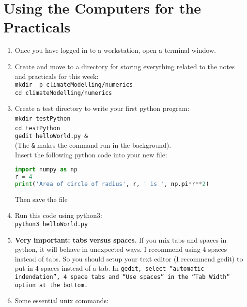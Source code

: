 \clearpage{}

\section{Using the Computers for the Practicals}
\begin{enumerate}
\item Once you have logged in to a workstation, open a terminal window.
\item Create and move to a directory for storing everything related to the
notes and practicals for this week:\\
\texttt{mkdir -p climateModelling/numerics}\\
\texttt{cd climateModelling/numerics}
\item Create a test directory to write your first python program:\\
\texttt{mkdir testPython}~\\
\texttt{cd testPython}~\\
\texttt{gedit helloWorld.py \&}\\
(The \texttt{\&} makes the command run in the background). \\
Insert the following python code into your new file:\\
\begin{lstlisting}[language=Python]
import numpy as np
r = 4
print('Area of circle of radius', r, ' is ', np.pi*r**2)
\end{lstlisting}
Then save the file
\item Run this code using python3:\\
\texttt{python3 helloWorld.py}
\item \textbf{Very important: tabs versus spaces.} If you mix tabs and spaces
in python, it will behave in unexpected ways. I recommend using 4
spaces instead of tabs. So you should setup your text editor (I recommend
gedit) to put in 4 spaces instead of a tab. In \texttt{gedit, select
``automatic indendation'', 4 space tabs and ``Use spaces'' in
the ``Tab Width'' option at the bottom.}
\item Some essential unix commands:


\end{enumerate}
